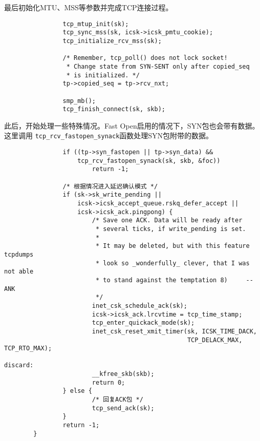最后初始化MTU、MSS等参数并完成TCP连接过程。
\begin{verbatim}
                tcp_mtup_init(sk);
                tcp_sync_mss(sk, icsk->icsk_pmtu_cookie);
                tcp_initialize_rcv_mss(sk);

                /* Remember, tcp_poll() does not lock socket!
                 * Change state from SYN-SENT only after copied_seq
                 * is initialized. */
                tp->copied_seq = tp->rcv_nxt;

                smp_mb();
                tcp_finish_connect(sk, skb);
\end{verbatim}
此后，开始处理一些特殊情况。Fast Open启用的情况下，SYN包也会带有数据。这里调用
\texttt{tcp_rcv_fastopen_synack}函数处理SYN包附带的数据。
\begin{verbatim}
                if ((tp->syn_fastopen || tp->syn_data) &&
                    tcp_rcv_fastopen_synack(sk, skb, &foc))
                        return -1;
                
                /* 根据情况进入延迟确认模式 */
                if (sk->sk_write_pending ||
                    icsk->icsk_accept_queue.rskq_defer_accept ||
                    icsk->icsk_ack.pingpong) {
                        /* Save one ACK. Data will be ready after
                         * several ticks, if write_pending is set.
                         *
                         * It may be deleted, but with this feature tcpdumps
                         * look so _wonderfully_ clever, that I was not able
                         * to stand against the temptation 8)     --ANK
                         */
                        inet_csk_schedule_ack(sk);
                        icsk->icsk_ack.lrcvtime = tcp_time_stamp;
                        tcp_enter_quickack_mode(sk);
                        inet_csk_reset_xmit_timer(sk, ICSK_TIME_DACK,
                                                  TCP_DELACK_MAX, TCP_RTO_MAX);

discard:
                        __kfree_skb(skb);
                        return 0;
                } else {
                        /* 回复ACK包 */
                        tcp_send_ack(sk);
                }
                return -1;
        }
\end{verbatim}

